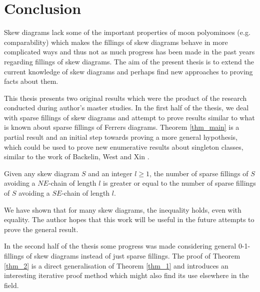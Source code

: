 \chapter*{Conclusion}

Skew diagrams lack some of the important properties of moon polyominoes (e.g. comparability) which makes the fillings of skew diagrams
behave in more complicated ways and thus not as much progress has been made in the past years regarding fillings of skew diagrams.
The aim of the present thesis is to extend the current knowledge of skew diagrams and perhaps find new approaches to proving
facts about them.

This thesis presents two original results which were the product of the research conducted during author's master studies.
In the first half of the thesis, we deal with sparse fillings of skew diagrams and attempt to prove results similar
to what is known about sparse fillings of Ferrers diagrams.
Theorem \ref{thm_main} is a partial result and an initial step towards proving a more general hypothesis, which
could be used to prove new enumerative results about singleton classes, similar to the work of Backelin, West and Xin \cite{Backelin07}.

\begin{hypo}
Given any skew diagram $S$ and an integer $l \geq 1$, the number of sparse fillings of $S$ avoiding a $NE$-chain of length $l$
is greater or equal to the number of sparse fillings of $S$ avoiding a $SE$-chain of length $l$.
\end{hypo}

We have shown that for many skew diagrams, the inequality holds, even with equality. The author hopes that this work will be useful
in the future attempts to prove the general result.


In the second half of the thesis some progress was made considering general 0-1-fillings of skew diagrams instead of just sparse fillings.
The proof of Theorem \ref{thm_2} is a direct generalisation of Theorem \ref{thm_1} and introduces an interesting iterative proof method
which might also find its use elsewhere in the field.

